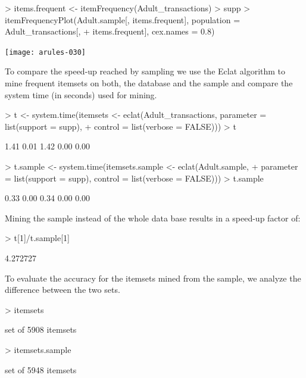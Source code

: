 \documentclass[10pt,a4paper]{article}
\begin{document}
\begin{Schunk}
\begin{Sinput}
> items.frequent <- itemFrequency(Adult_transactions) > supp
> itemFrequencyPlot(Adult.sample[, items.frequent], population = Adult_transactions[, 
+     items.frequent], cex.names = 0.8)
\end{Sinput}
\end{Schunk}
\texttt{[image: arules-030]}

To compare the speed-up reached by sampling we use the Eclat algorithm
to mine frequent itemsets on both, the database and the sample
and compare the system time (in seconds) used for mining.

\begin{Schunk}
\begin{Sinput}
> t <- system.time(itemsets <- eclat(Adult_transactions, parameter = list(support = supp), 
+     control = list(verbose = FALSE)))
> t
\end{Sinput}
\begin{Soutput}
[1] 1.41 0.01 1.42 0.00 0.00

\end{Soutput}
\begin{Sinput}
> t.sample <- system.time(itemsets.sample <- eclat(Adult.sample, 
+     parameter = list(support = supp), control = list(verbose = FALSE)))
> t.sample
\end{Sinput}
\begin{Soutput}
[1] 0.33 0.00 0.34 0.00 0.00

\end{Soutput}
\end{Schunk}


Mining the sample instead of the whole data base results in a speed-up
factor of:
\begin{Schunk}
\begin{Sinput}
> t[1]/t.sample[1]
\end{Sinput}
\begin{Soutput}
[1] 4.272727

\end{Soutput}
\end{Schunk}


To evaluate the accuracy for the itemsets mined from the sample, we
analyze the difference between the two sets.

\begin{Schunk}
\begin{Sinput}
> itemsets
\end{Sinput}
\begin{Soutput}
set of 5908 itemsets 

\end{Soutput}
\begin{Sinput}
> itemsets.sample
\end{Sinput}
\begin{Soutput}
set of 5948 itemsets 

\end{Soutput}
\end{Schunk}
\end{document}
